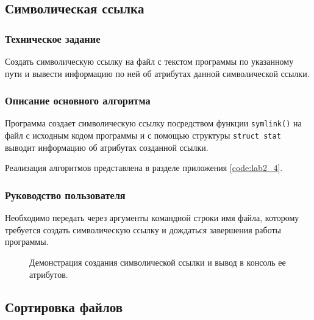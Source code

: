 \documentclass[a4paper,14pt]{extarticle}
\begin{document}
\subsection{Символическая ссылка}
\subsubsection{Техническое задание}
Создать символическую ссылку на файл с текстом программы по указанному пути и вывести информацию по ней об атрибутах данной символической ссылки.

\subsubsection{Описание основного алгоритма}
Программа создает символическую ссылку посредством функции \verb|symlink()| на файл с исходным кодом программы и с помощью структуры \verb|struct stat| выводит информацию об атрибутах созданной ссылки.

Реализация алгоритмов представлена в разделе приложения \ref{code:lab2_4}.

\subsubsection{Руководство пользователя}

Необходимо передать через аргументы командной строки имя файла, которому требуется создать символическую ссылку и дождаться завершения работы программы.

\begin{figure}[h]
\caption{Демонстрация создания символической ссылки и вывод в консоль ее атрибутов.}
\label{1.png}
\end{figure}

\subsection{Сортировка файлов}
\end{document}
